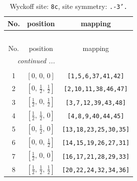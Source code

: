 \documentclass[fleqn,8pt]{jsarticle}
\begin{document}
\begin{longtable}{ccc}
\caption{Wyckoff site: {\tt 8c}, site symmetry: {\tt .-3'.}}
 \\
 \hline \hline
No. & position & mapping \\ \hline \endfirsthead

\multicolumn{2}{l}{\tablename\ \thetable{}} \\
 \hline \hline
No. & position & mapping \\ \hline \endhead

 \hline \hline
\multicolumn{2}{r}{\footnotesize\it continued ...} \\ \endfoot

 \hline \hline
\multicolumn{2}{r}{} \\ \endlastfoot

1 & $\left[ 0,\, 0,\, 0 \right]$ & {\tt [1,5,6,37,41,42]} \\ \hline
2 & $\left[ 0,\, \frac{1}{2},\, \frac{1}{2} \right]$ & {\tt [2,10,11,38,46,47]} \\ \hline
3 & $\left[ \frac{1}{2},\, 0,\, \frac{1}{2} \right]$ & {\tt [3,7,12,39,43,48]} \\ \hline
4 & $\left[ \frac{1}{2},\, \frac{1}{2},\, 0 \right]$ & {\tt [4,8,9,40,44,45]} \\ \hline
5 & $\left[ 0,\, \frac{1}{2},\, 0 \right]$ & {\tt [13,18,23,25,30,35]} \\ \hline
6 & $\left[ 0,\, 0,\, \frac{1}{2} \right]$ & {\tt [14,15,19,26,27,31]} \\ \hline
7 & $\left[ \frac{1}{2},\, 0,\, 0 \right]$ & {\tt [16,17,21,28,29,33]} \\ \hline
8 & $\left[ \frac{1}{2},\, \frac{1}{2},\, \frac{1}{2} \right]$ & {\tt [20,22,24,32,34,36]} \\
\end{longtable}
\renewcommand{\arraystretch}{1.2}
\end{document}
